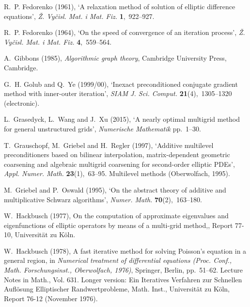 \documentclass[12pt]{acta_2011xz}
\begin{document}
\begin{thebibliography}{xx}
R.~P. Fedorenko  (1961), `A relaxation method of solution of elliptic
  difference equations', {\em \v Z. Vy\v cisl. Mat. i Mat. Fiz.} {\bf
  1},~922--927.

R.~P. Fedorenko  (1964), `On the speed of convergence of an iteration process',
  {\em \v Z. Vy\v cisl. Mat. i Mat. Fiz.} {\bf 4},~559--564.

A.~Gibbons  (1985), {\em Algorithmic graph theory}, Cambridge University Press,
  Cambridge.

G.~H. Golub and Q.~Ye  (1999/00), `Inexact preconditioned conjugate gradient
  method with inner-outer iteration', {\em SIAM J. Sci. Comput.} {\bf
  21}(4),~1305--1320 (electronic).

L.~Grasedyck, L.~Wang and J.~Xu  (2015), `A nearly optimal multigrid method for
  general unstructured grids', {\em Numerische Mathematik} pp.~1--30.

T.~Grauschopf, M.~Griebel and H.~Regler  (1997), `Additive multilevel
  preconditioners based on bilinear interpolation, matrix-dependent geometric
  coarsening and algebraic multigrid coarsening for second-order elliptic
  {PDE}s', {\em Appl. Numer. Math.} {\bf 23}(1),~63--95.
\newblock Multilevel methods (Oberwolfach, 1995).

M.~Griebel and P.~Oswald  (1995), `On the abstract theory of additive and
  multiplicative {S}chwarz algorithms', {\em Numer. Math.} {\bf
  70}(2),~163--180.

W.~Hackbusch  (1977), On the computation of approximate eigenvalues and
  eigenfunctions of elliptic operators by means of a multi-grid method,, Report
  77-10, Universit\"{a}t zu K\"{o}ln.

W.~Hackbusch  (1978), A fast iterative method for solving {P}oisson's equation
  in a general region, in {\em Numerical treatment of differential equations
  ({P}roc. {C}onf., {M}ath. {F}orschungsinst., {O}berwolfach, 1976)}, Springer,
  Berlin, pp.~51--62. Lecture Notes in Math., Vol. 631.
\newblock Longer version: Ein Iteratives Verfahren zur Schnellen Aufl\"{o}sung
  Elliptischer Randwertprobleme, Math. Inst., Universit\"{a}t zu K\"{o}ln,
  Report 76-12 (November 1976).


\end{thebibliography}
\end{document}
